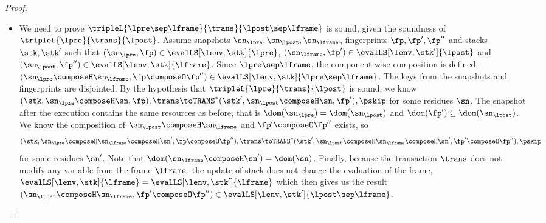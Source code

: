 \begin{proof}
\begin{itemize}
\item {}
We need to prove \( \tripleL{\lpre \sep \lframe }{\trans}{\lpost \sep \lframe} \) is sound, 
given the soundness of  \( \tripleL{\lpre}{\trans}{\lpost} \).
Assume snapshots \( \sn_\lpre, \sn_\lpost, \sn_\lframe \), fingerprints \( \fp, \fp', \fp'' \) and stacks\( \stk, \stk' \) 
such that \( ( \sn_\lpre, \fp ) \in \evalLS[\lenv, \stk]{\lpre} \), \( ( \sn_\lframe, \fp' ) \in \evalLS[\lenv, \stk']{\lpost} \) and \( ( \sn_\lpost, \fp'' ) \in \evalLS[\lenv, \stk]{\lframe}\).
Since \( \lpre \sep \lframe \), the component-wise composition is defined, \ie \( (\sn_\lpre \composeH \sn_\lframe, \fp \composeO \fp'') \in \evalLS[\lenv, \stk]{\lpre \sep \lframe} \).
The keys from the snapshots and fingerprints are disjointed.
By the hypothesis that \( \tripleL{\lpre}{\trans}{\lpost} \) is sound, 
we know \( ( \stk, \sn_\lpre \composeH \sn, \fp ), \trans \toTRANS^{*} ( \stk', \sn_\lpost \composeH \sn, \fp' ), \pskip \) for some residues \( \sn \).
The snapshot after the execution contains the same resources as before, that is \( \dom(\sn_\lpre) = \dom(\sn_\lpost) \) and \( \dom(\fp') \subseteq \dom(\sn_\lpost) \).
We know the composition of \( \sn_\lpost \composeH \sn_\lframe \) and \( \fp' \composeO \fp''\) exists, 
so 
\[ 
    ( \stk, \sn_\lpre \composeH \sn_\lframe \composeH \sn', \fp \composeO \fp''), \trans \toTRANS^{*} ( \stk', \sn_\lpost \composeH \sn_\lframe \composeH \sn', \fp' \composeO \fp'' ), \pskip 
\]
for some residues \( \sn' \).
Note that \( \dom(\sn_\lframe \composeH \sn') = \dom(\sn) \).
Finally, because the transaction \( \trans \) does not modify any variable from the frame \( \lframe \), 
the update of stack does not change the evaluation of the frame, 
\( \evalLS[\lenv, \stk]{\lframe} = \evalLS[\lenv, \stk']{\lframe} \) which then gives us the result \( (\sn_\lpost \composeH \sn_\lframe, \fp' \composeO \fp'') \in \evalLS[\lenv, \stk']{\lpost \sep \lframe} \).
\end{itemize}
\end{proof}

